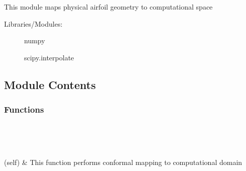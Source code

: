 \documentclass[letterpaper,10pt,english]{sphinxmanual}
\begin{document}
\section{}
\label{\detokenize{autoapi/geom_func/index:module-geom_func}}\label{\detokenize{autoapi/geom_func/index:geom-func}}\label{\detokenize{autoapi/geom_func/index::doc}}
\sphinxAtStartPar
This module maps physical airfoil geometry to computational space
\begin{description}
\item[{Libraries/Modules:}] \leavevmode
\sphinxAtStartPar
numpy

\sphinxAtStartPar
scipy.interpolate

\end{description}


\subsection{Module Contents}
\label{\detokenize{autoapi/geom_func/index:module-contents}}

\subsubsection{Functions}
\label{\detokenize{autoapi/geom_func/index:functions}}

\begin{savenotes}\sphinxatlongtablestart\begin{longtable}[c]{}
\hline

\endfirsthead

%
{}\\
\hline

\endhead

\hline
{}\\
\endfoot

\endlastfoot

\sphinxAtStartPar
{\hyperref[\detokenize{autoapi/geom_func/index:geom_func.geom}]{}}(self)
&
\sphinxAtStartPar
This function performs conformal mapping to computational domain
\\
\hline
\end{longtable}\sphinxatlongtableend\end{savenotes}
\end{document}
